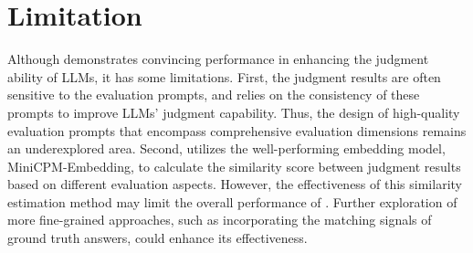\section*{Limitation}
Although \method{} demonstrates convincing performance in enhancing the judgment ability of LLMs, it has some limitations. First, the judgment results are often sensitive to the evaluation prompts, and \method{} relies on the consistency of these prompts to improve LLMs' judgment capability. Thus, the design of high-quality evaluation prompts that encompass comprehensive evaluation dimensions remains an underexplored area. Second, \method{} utilizes the well-performing embedding model, MiniCPM-Embedding, to calculate the similarity score between judgment results based on different evaluation aspects. However, the effectiveness of this similarity estimation method may limit the overall performance of \method{}. Further exploration of more fine-grained approaches, such as incorporating the matching signals of ground truth answers, could enhance its effectiveness.











